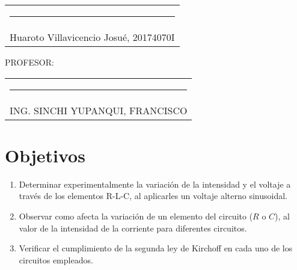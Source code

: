 \documentclass[a4paper,12pt]{report}
\begin{document}
\begin{center}
\begin{tabular}{c}
\rule[1pt]{3.14in}{1pt}\\
Huaroto Villavicencio Josué, 20174070I \\[2.5cm]
\end{tabular}
\end{center}
{\large PROFESOR:} \\[2cm]
\begin{center}
\begin{tabular}{c}
\rule[3pt]{4.8in}{1pt}\\[1pt]
ING. SINCHI YUPANQUI, FRANCISCO 
\end{tabular}
\end{center}
\vfill
\newpage
\tableofcontents
\newpage
{} %
\setcounter{page}{1}  %
\chapter{Objetivos}
\begin{enumerate}
\item Determinar experimentalmente la variación de la intensidad y el voltaje a través de los elementos R-L-C, al aplicarles un voltaje alterno sinusoidal.
\item Observar como afecta la variación de un elemento del circuito ($R$ o $C$), al valor de la intensidad de la corriente para diferentes circuitos.
\item Verificar el cumplimiento de la segunda ley de Kirchoff en cada uno de los circuitos empleados.
\end{enumerate}
\end{document}

